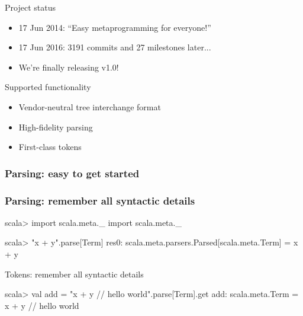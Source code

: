 \documentclass[svgnames,dvipsnames,hyperref={bookmarks=false},usepdftitle=false]{beamer}
\begin{document}

\begin{frame}{Project status}
\begin{itemize}
\item 17 Jun 2014: ``Easy metaprogramming for everyone!''
\item<2-> 17 Jun 2016: 3191 commits and 27 milestones later...
\item<3-> \alert<3->{We're finally releasing v1.0!}
\end{itemize}
\end{frame}

\begin{frame}{Supported functionality}
\begin{itemize}
\item Vendor-neutral tree interchange format
\item High-fidelity parsing
\item First-class tokens
\end{itemize}
\end{frame}

\begin{frame}[fragile]
\frametitle<1>{Parsing: easy to get started}
\frametitle<2>{Parsing: remember all syntactic details}
\begin{semiverbatim}
scala> import scala.meta._
import scala.meta._

scala> "x + y".parse[Term]
res0: scala.meta.parsers.Parsed[scala.meta.Term] = x + y

\end{semiverbatim}
\end{frame}

\begin{frame}[fragile]{Tokens: remember all syntactic details}
\begin{semiverbatim}
scala> val add = "x + y // hello world".parse[Term].get
add: scala.meta.Term = x + y // hello world


\only<2->{res3: String = Tokens(BOF [0..0), x [0..1),  [1..2), }
\only<2->{+ [2..3), [3..4), y [4..5),   [5..6), }
\only<2->{// hello world [6..20), EOF [20..20))}
\end{semiverbatim}
\end{frame}
\end{document}

